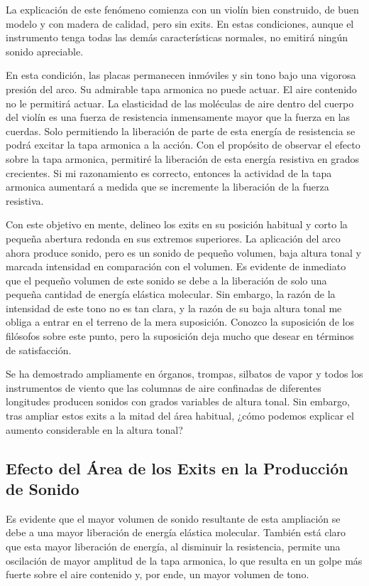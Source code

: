 \documentclass[12pt]{book}
\begin{document}
La explicación de este fenómeno comienza con un violín bien construido, de buen modelo y con madera de calidad, pero sin exits. En estas condiciones, aunque el instrumento tenga todas las demás características normales, no emitirá ningún sonido apreciable. 

En esta condición, las placas permanecen inmóviles y sin tono bajo una vigorosa presión del arco. Su admirable tapa armonica no puede actuar. El aire contenido no le permitirá actuar. La elasticidad de las moléculas de aire dentro del cuerpo del violín es una fuerza de resistencia inmensamente mayor que la fuerza en las cuerdas. Solo permitiendo la liberación de parte de esta energía de resistencia se podrá excitar la tapa armonica a la acción. Con el propósito de observar el efecto sobre la tapa armonica, permitiré la liberación de esta energía resistiva en grados crecientes. Si mi razonamiento es correcto, entonces la actividad de la tapa armonica aumentará a medida que se incremente la liberación de la fuerza resistiva.

Con este objetivo en mente, delineo los exits en su posición habitual y corto la pequeña abertura redonda en sus extremos superiores. La aplicación del arco ahora produce sonido, pero es un sonido de pequeño volumen, baja altura tonal y marcada intensidad en comparación con el volumen. Es evidente de inmediato que el pequeño volumen de este sonido se debe a la liberación de solo una pequeña cantidad de energía elástica molecular. Sin embargo, la razón de la intensidad de este tono no es tan clara, y la razón de su baja altura tonal me obliga a entrar en el terreno de la mera suposición. Conozco la suposición de los filósofos sobre este punto, pero la suposición deja mucho que desear en términos de satisfacción.

Se ha demostrado ampliamente en órganos, trompas, silbatos de vapor y todos los instrumentos de viento que las columnas de aire confinadas de diferentes longitudes producen sonidos con grados variables de altura tonal. Sin embargo, tras ampliar estos exits a la mitad del área habitual, ¿cómo podemos explicar el aumento considerable en la altura tonal? 

\subsection*{Efecto del Área de los Exits en la Producción de Sonido}

Es evidente que el mayor volumen de sonido resultante de esta ampliación se debe a una mayor liberación de energía elástica molecular. También está claro que esta mayor liberación de energía, al disminuir la resistencia, permite una oscilación de mayor amplitud de la tapa armonica, lo que resulta en un golpe más fuerte sobre el aire contenido y, por ende, un mayor volumen de tono.
\end{document}
